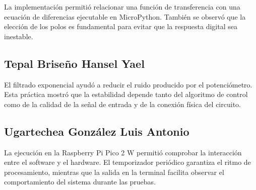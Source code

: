 \documentclass[12pt, letterpaper]{article}
\begin{document}
La implementación permitió relacionar una función de transferencia con una
ecuación de diferencias ejecutable en MicroPython. También se observó que la
elección de los polos es fundamental para evitar que la respuesta digital sea
inestable.

\subsection{Tepal Briseño Hansel Yael}

El filtrado exponencial ayudó a reducir el ruido producido por el
potenciómetro. Esta práctica mostró que la estabilidad depende tanto del
algoritmo de control como de la calidad de la señal de entrada y de la conexión
física del circuito.

\subsection{Ugartechea González Luis Antonio}

La ejecución en la Raspberry Pi Pico 2 W permitió comprobar la interacción
entre el software y el hardware. El temporizador periódico garantiza el ritmo
de procesamiento, mientras que la salida en la terminal facilita observar el
comportamiento del sistema durante las pruebas.

%
\end{document}
